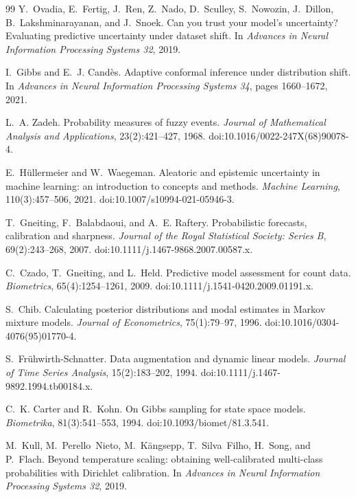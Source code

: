 \documentclass[11pt,a4paper]{article}
\numberwithin{equation}{section}
\theoremstyle{plain}
\theoremstyle{definition}
\theoremstyle{remark}
\begin{document}
\begin{thebibliography}{99}
Y.~Ovadia, E.~Fertig, J.~Ren, Z.~Nado, D.~Sculley, S.~Nowozin, J.~Dillon, B.~Lakshminarayanan, and J.~Snoek.
\newblock Can you trust your model's uncertainty? {E}valuating predictive uncertainty under dataset shift.
\newblock In \emph{Advances in Neural Information Processing Systems 32}, 2019.

I.~Gibbs and E.~J. Cand{\`e}s.
\newblock Adaptive conformal inference under distribution shift.
\newblock In \emph{Advances in Neural Information Processing Systems 34}, pages 1660--1672, 2021.

L.~A. Zadeh.
\newblock Probability measures of fuzzy events.
\newblock \emph{Journal of Mathematical Analysis and Applications}, 23(2):421--427, 1968. doi:10.1016/0022-247X(68)90078-4.

E.~H{\"u}llermeier and W.~Waegeman.
\newblock Aleatoric and epistemic uncertainty in machine learning: an introduction to concepts and methods.
\newblock \emph{Machine Learning}, 110(3):457--506, 2021. doi:10.1007/s10994-021-05946-3.

T.~Gneiting, F.~Balabdaoui, and A.~E. Raftery.
\newblock Probabilistic forecasts, calibration and sharpness.
\newblock \emph{Journal of the Royal Statistical Society: Series B}, 69(2):243--268, 2007. doi:10.1111/j.1467-9868.2007.00587.x.

C.~Czado, T.~Gneiting, and L.~Held.
\newblock Predictive model assessment for count data.
\newblock \emph{Biometrics}, 65(4):1254--1261, 2009. doi:10.1111/j.1541-0420.2009.01191.x.

S.~Chib.
\newblock Calculating posterior distributions and modal estimates in {M}arkov mixture models.
\newblock \emph{Journal of Econometrics}, 75(1):79--97, 1996. doi:10.1016/0304-4076(95)01770-4.

S.~Fr{\"u}hwirth-Schnatter.
\newblock Data augmentation and dynamic linear models.
\newblock \emph{Journal of Time Series Analysis}, 15(2):183--202, 1994. doi:10.1111/j.1467-9892.1994.tb00184.x.

C.~K. Carter and R.~Kohn.
\newblock On {G}ibbs sampling for state space models.
\newblock \emph{Biometrika}, 81(3):541--553, 1994. doi:10.1093/biomet/81.3.541.

M.~Kull, M.~Perello~Nieto, M.~K{\"a}ngsepp, T.~Silva~Filho, H.~Song, and P.~Flach.
\newblock Beyond temperature scaling: obtaining well-calibrated multi-class probabilities with {D}irichlet calibration.
\newblock In \emph{Advances in Neural Information Processing Systems 32}, 2019.

\end{thebibliography}
\end{document}

